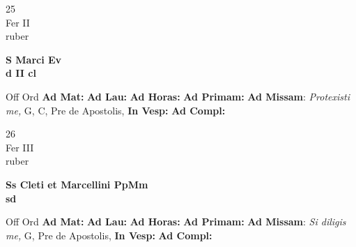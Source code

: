 \documentclass[10pt, openany]{book}
\begin{document}
        \begin{center}
            \begin{minipage}{3.5in}
                \vspace{2em}
                \begin{minipage}{0.5in}
                    {\Huge 25} \\
                    {\normalsize Fer II} \\
                    {\normalsize ruber}
                \end{minipage}
                \begin{minipage}{3.0in}
                    \textbf{ \large S Marci Ev \\
                    \textnormal{\normalsize d II cl}} \\ 
                \end{minipage}
                \begin{justify}Off Ord
                    \textbf{Ad Mat: }
                    \textbf{Ad Lau: }
                    \textbf{Ad Horas: }
                    \textbf{Ad Primam: }\textbf{Ad Missam}: \textit{Protexisti me,} G, C, Pre de Apostolis,  
                    \textbf{In Vesp: }
                    \textbf{Ad Compl: }
                \end{justify}
            \end{minipage}
        \end{center}
    
        \begin{center}
            \begin{minipage}{3.5in}
                \vspace{2em}
                \begin{minipage}{0.5in}
                    {\Huge 26} \\
                    {\normalsize Fer III} \\
                    {\normalsize ruber}
                \end{minipage}
                \begin{minipage}{3.0in}
                    \textbf{ \large Ss Cleti et Marcellini PpMm \\
                    \textnormal{\normalsize sd}} \\ 
                \end{minipage}
                \begin{justify}Off Ord
                    \textbf{Ad Mat: }
                    \textbf{Ad Lau: }
                    \textbf{Ad Horas: }
                    \textbf{Ad Primam: }\textbf{Ad Missam}: \textit{Si diligis me,} G, Pre de Apostolis,  
                    \textbf{In Vesp: }
                    \textbf{Ad Compl: }
                \end{justify}
            \end{minipage}
        \end{center}
    
\end{document}
